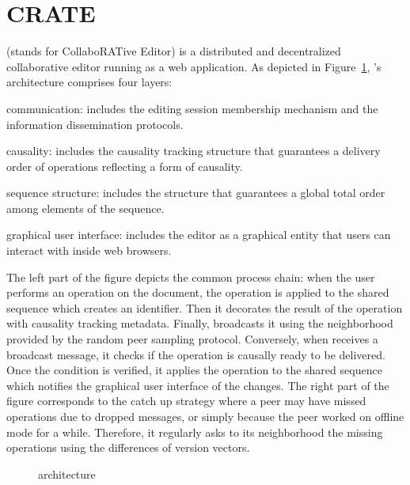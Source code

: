 
\section{CRATE}
\label{sec:proposal}

\CRATE (stands for CollaboRATive Editor) is a distributed and decentralized
collaborative editor running as a web application. As depicted in
Figure~\ref{fig:architecture}, \CRATE's architecture comprises four layers:
\begin{inparaenum}[(i)]
\item communication: includes the editing session membership mechanism and the
  information dissemination protocols.
\item causality: includes the causality tracking structure that guarantees a
  delivery order of operations reflecting a form of causality.
\item sequence structure: includes the structure that guarantees a global
  total order among elements of the sequence.
\item graphical user interface: includes the editor as a graphical entity that
  users can interact with inside web browsers.
\end{inparaenum}
The left part of the figure depicts the common process chain: when the user
performs an operation on the document, the operation is applied to the shared
sequence which creates an \LSEQ identifier. Then it decorates the result of the
operation with causality tracking metadata. Finally, \CRATE broadcasts it using
the neighborhood provided by the \SPRAY random peer sampling protocol.
Conversely, when \CRATE receives a broadcast message, it checks if the operation
is causally ready to be delivered. Once the condition is verified, it applies
the operation to the shared sequence which notifies the graphical user interface
of the changes.  The right part of the figure corresponds to the catch up
strategy where a peer may have missed operations due to dropped messages, or
simply because the peer worked on offline mode for a while. Therefore, it
regularly asks to its neighborhood the missing operations using the differences
of version vectors.

\begin{figure}
  \centering
  
  \caption{\label{fig:architecture}\CRATE architecture}
\end{figure}

